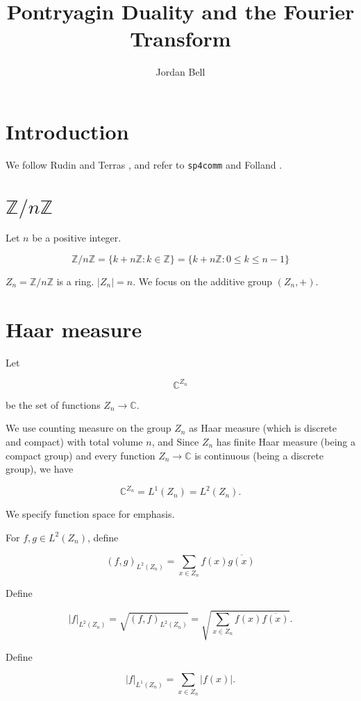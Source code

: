 \documentclass[11pt]{article} %
\title{Pontryagin Duality and the Fourier Transform}
\author{Jordan Bell}
\begin{document}
\maketitle

\tableofcontents

\section{Introduction}
We follow Rudin \cite{rudin} and Terras \cite{terras}, and refer to \texttt{sp4comm} \cite{sp4comm} and  Folland \cite{folland}.

\section{$\mathbb{Z}/n\mathbb{Z}$}

Let $n$ be a positive integer.

$$
\mathbb{Z}/n\mathbb{Z} = \{k + n\mathbb{Z} : k \in \mathbb{Z}\} = \{ k + n \mathbb{Z}: 0 \leq k \leq n-1\}
$$

$Z_n=\mathbb{Z}/n\mathbb{Z}$ is a ring. $|Z_n|=n$. We focus on the additive group $(Z_n,+)$.

\section{Haar measure}

Let

$$\mathbb{C}^{Z_n}$$

be the set of functions $Z_n \to \mathbb{C}$.

We use counting measure on the group $Z_n$ as Haar measure (which is discrete and compact) with total volume $n$, and  Since $Z_n$ has finite Haar measure (being a compact group) and every function $Z_n \to \mathbb{C}$ is continuous (being a discrete group), we have

$$\mathbb{C}^{Z_n}=L^1(Z_n)=L^2(Z_n).$$

We specify function space for emphasis.

For $f,g \in L^2(Z_n)$, define

$$
(f,g)_{L^2(Z_n)} = \sum_{x \in Z_n} f(x) \overline{g(x)} 
$$

Define

$$|f|_{L^2(Z_n)} = \sqrt{(f,f)_{L^2(Z_n)}}=\sqrt{\sum_{x \in Z_n} f(x) \overline{f(x)}}.$$

Define

$$
|f|_{L^1(Z_n)} = \sum_{x \in Z_n} |f(x)|.
$$
\end{document}

